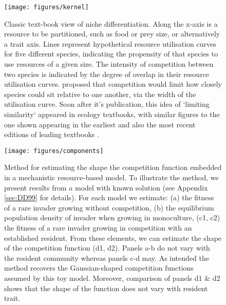 \documentclass[a4paper,11pt]{article}
\begin{document}
\begin{figure}[h]
  \centering
  \texttt{[image: figures/kernel]}
  \caption{Classic text-book view of niche differentiation.  Along the
    x-axis is a resource to be partitioned, such as food or prey size,
    or alternatively a trait axis.  Lines represent hypothetical
    resource utilisation curves for five different species, indicating
    the propensity of that species to use resources of a given size.
    The intensity of competition between two species is indicated by
    the degree of overlap in their resource utilisation
    curves. \citet{MacArthur-1967} proposed that competition would
    limit how closely species could sit relative to one another, via
    the width of the utilisation curve. Soon after it's publication,
    this idea of `limiting similarity` appeared in ecology textbooks,
    with similar figures to the one shown appearing in the earliest
    and also the most recent editions of leading textbooks
    \citep{Begon-1986, Begon-2006, Krebs-1978, Krebs-2013,
      Ricklefs-1973, Ricklefs-1999}.}
  \label{fig:competition-kernels}
\end{figure}

\begin{figure}[h]
 \centering
 \texttt{[image: figures/components]}
 \caption{Method for estimating the shape the competition function embedded
  in a mechanistic resource-based model. To illustrate the method, we present
  results from a model with known solution \citep{Dieckmann-1999} (see Appendix
  \ref{sec:DD99} for details). For each
  model we estimate: (a) the fitness of a rare invader growing without competition,
  (b) the equilibrium population density of invader when growing in monoculture,
  (c1, c2) the fitness of a rare invader growing in competition with an established
  resident. From these elements, we can estimate the shape of the competition
  function (d1, d2). Panels a-b do not vary with the resident community whereas
  panels c-d may.  As intended the method recovers the Gaussian-shaped competition
  functions assumed by this toy model. Moreover, comparison of panels d1 \& d2
  shows that the shape of the function does not vary with resident trait.}
  \label{fig:components}
\end{figure}
\end{document}
